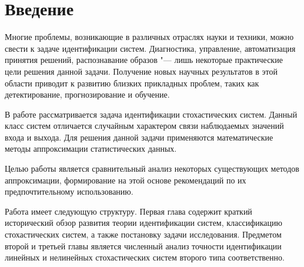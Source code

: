 \chapter*{Введение}

Многие проблемы, возникающие в различных отраслях науки и техники,
можно свести к задаче идентификации систем.
Диагностика, управление, автоматизация принятия решений, распознавание образов
"--- лишь некоторые практические цели решения данной задачи.
Получение новых научных результатов в этой области приводит к
развитию близких прикладных проблем,
таких как детектирование, прогнозирование и обучение.

В работе рассматривается задача идентификации стохастических систем.
Данный класс систем отличается случайным характером связи наблюдаемых
значений входа и выхода.
Для решения данной задачи применяются математические методы
аппроксимации статистических данных.

Целью работы является сравнительный анализ некоторых существующих методов аппроксимации,
формирование на этой основе рекомендаций по их предпочтительному использованию.

Работа имеет следующую структуру.
Первая глава содержит краткий исторический обзор развития теории идентификации систем,
классификацию стохастических систем, а также постановку задачи исследования.
Предметом второй и третьей главы является численный анализ точности идентификации
линейных и нелинейных стохастических систем второго типа соответственно.